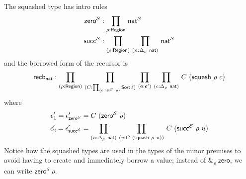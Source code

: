 \begin{eg}
	The squashed type has intro rules
	\begin{align*}
		\mathsf{zero}^{\mathcal S} &: \prd{\rho:\Region} \mathsf{nat}^{\mathcal S} \\
		\mathsf{succ}^{\mathcal S} &: \prd{\rho:\Region}{n:\Delta_\rho\ \mathsf{nat}} \mathsf{nat}^{\mathcal S}
	\end{align*}
	and the borrowed form of the recursor is
	\[ \mathsf{recb}_{\mathsf{nat}} : \prd{\rho:\Region}{C:\prd{c:\mathsf{nat}^{\mathcal S}\ \rho}\Sort \ell}{\vb e : \bm \epsilon'}{c:\Delta_\rho\ \mathsf{nat}}C\ (\mathsf{squash}\ \rho\ c) \]
	where
	\begin{align*}
		\epsilon_1' = \epsilon_{\mathsf{zero}^{\mathcal S}}' &= C\ (\mathsf{zero}^{\mathcal S}\ \rho) \\
		\epsilon_2' = \epsilon_{\mathsf{succ}^{\mathcal S}}' &= \prd{u:\Delta_\rho\ \mathsf{nat}}{v:C\ (\mathsf{squash}\ \rho\ u)} C\ (\mathsf{succ}^{\mathcal S}\ \rho\ u)
	\end{align*}
	Notice how the squashed types are used in the types of the minor premises to avoid having to create and immediately borrow a value; instead of \( \&_\rho\ \mathsf{zero} \), we can write \( \mathsf{zero}^{\mathcal S}\ \rho \).
\end{eg}
